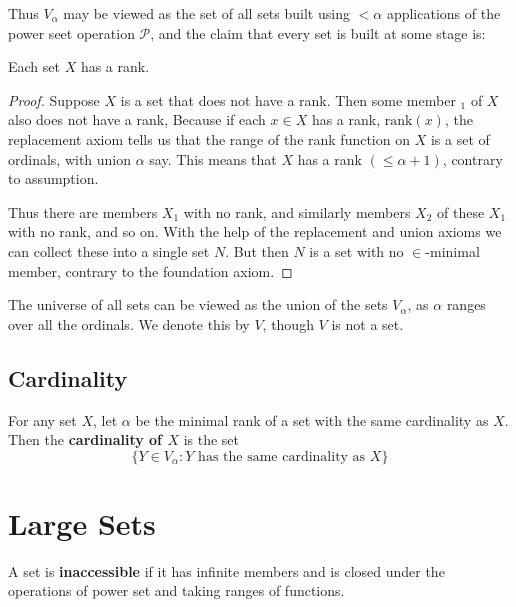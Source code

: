 \documentclass[12pt, a4paper, oneside, openright, titlepage]{book}
\begin{document}
Thus $V_{\alpha}$ may be viewed as the set of all sets built using $< \alpha$ applications of the power seet operation $\mathcal{P}$, and the claim that every set is built at some stage is: 

\begin{thm} 
    Each set $X$ has a rank.
\end{thm}
\begin{proof}
    Suppose $X$ is a set that does not have a rank. Then some member $_1$ of $X$ also does not have a rank, Because if each $x \in X$ has a rank, $\text{rank}(x)$, the replacement axiom tells us that the range of the rank function on $X$ is a set of ordinals, with union $\alpha$ say. This means that $X$ has a rank $(\leq \alpha+1)$, contrary to assumption.

    Thus there are members $X_1$ with no rank, and similarly members $X_2$ of these $X_1$ with no rank, and so on. With the help of the replacement and union axioms we can collect these into a single set $N$. But then $N$ is a set with no $\in$-minimal member, contrary to the foundation axiom.
\end{proof}

The universe of all sets can be viewed as the union of the sets $V_{\alpha}$, as $\alpha$ ranges over all the ordinals. We denote this by $V$, though $V$ is not a set.


\subsection{Cardinality}

\begin{defn}
    For any set $X$, let $\alpha$ be the minimal rank of a set with the same cardinality as $X$. Then the \textbf{cardinality of $X$} is the set \begin{equation*}
        \{Y \in V_{\alpha}:Y\text{ has the same cardinality as $X$}\}
    \end{equation*}
\end{defn}


\section{Large Sets}

\begin{defn}
    A set is \textbf{inaccessible} if it has infinite members and is closed under the operations of power set and taking ranges of functions.
\end{defn}
\end{document}
